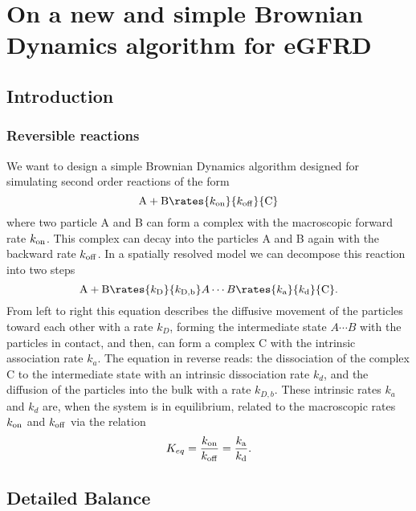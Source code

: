 \section{On a new and simple Brownian Dynamics algorithm for eGFRD}

\subsection{Introduction}

\subsubsection{Reversible reactions}
We want to design a simple Brownian Dynamics algorithm designed for simulating second order reactions of the form
\begin{equation}
{\rm A} + {\rm B} \rates{k_{\rm on}}{k_{\rm off}} {\rm C}
\end{equation}
where two particle A and B can form a complex with the macroscopic forward rate $k_{\rm on}$. This complex can decay into the particles A and B again with the backward rate $k_{\rm off}$. In a spatially resolved model we can decompose this reaction into two steps \cite{Agmon1990}
\begin{equation}
{\rm A} + {\rm B} \rates{k_{\rm D}}{k_{\rm D,b}} A \cdots B \rates{k_{\rm a}}{k_{\rm d}} {\rm C}.
\end{equation}
From left to right this equation describes the diffusive movement of the particles toward each other with a rate $k_D$, forming the intermediate state $A \cdots B$ with the particles in contact, and then, can form a complex C with the intrinsic association rate $k_a$. The equation in reverse reads: the dissociation of the complex C to the intermediate state with an intrinsic dissociation rate $k_d$, and the diffusion of the particles into the bulk with a rate $k_{D,b}$. These intrinsic rates $k_a$ and $k_d$ are, when the system is in equilibrium, related to the macroscopic rates $k_{\rm on}$ and $k_{\rm off}$ via the relation \cite{Agmon1990}
\begin{equation}
K_{eq} = \frac{k_{\rm on}}{k_{\rm off}} = \frac{k_{\rm a}}{k_{\rm d}}.
\end{equation}

\subsection{Detailed Balance}


